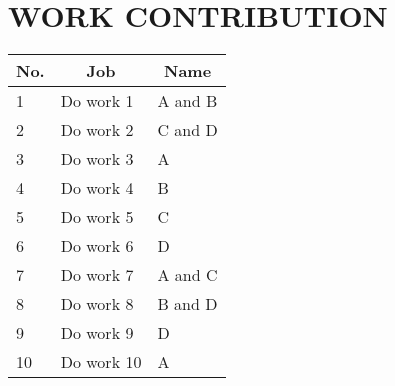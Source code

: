 \section*{WORK CONTRIBUTION}
 {}

\begin{table}[!ht]
\begin{tabular}{|l|l|l|}
\hline
\multicolumn{1}{|c|}{\textbf{No.}} & \multicolumn{1}{c|}{\textbf{Job}}                  & \multicolumn{1}{c|}{\textbf{Name}} \\ \hline
1 & Do work 1  & A and B  \\ \hline
2 & Do work 2  & C and D  \\ \hline
3 & Do work 3  & A  \\ \hline
4 & Do work 4 & B  \\ \hline
5 & Do work 5  & C \\ \hline
6 & Do work 6  & D  \\ \hline
7 & Do work 7 & A and C \\ \hline
8 & Do work 8   & B and D  \\ \hline
9 & Do work 9  & D \\ \hline
10 & Do work 10  & A\\ \hline
\end{tabular}
\end{table}

\newpage